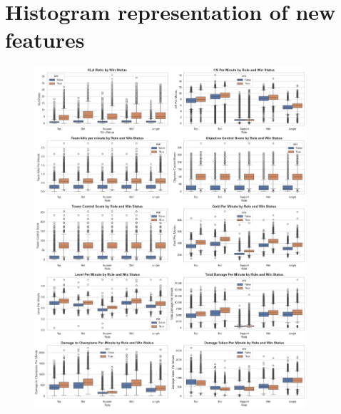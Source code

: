 \documentclass[12pt, a4paper]{article}
\begin{document}
\section{Histogram representation of new features}\label{sec:new_features_histogram}
\begin{figure}[!ht]
    \centering
    \includegraphics[width=0.9\textwidth]{figures/0_visualization_new_features_histogram_by_role.png}
\end{figure}

\clearpage
\end{document}
